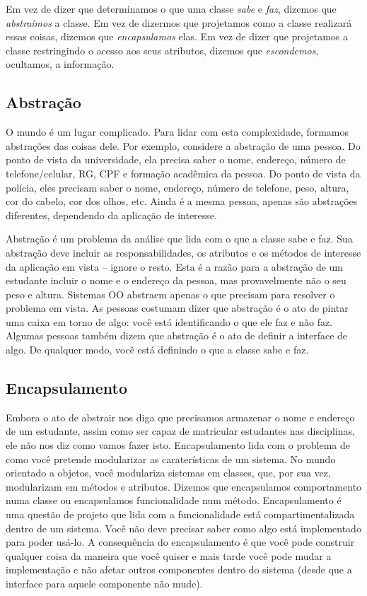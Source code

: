 \documentclass[
	11pt,				%
	openright,
	twoside,			%
	a4paper,			%
	english,			%
	french,
	brazil,				%
	sumario=tradicional
	]{abntex2}
\begin{document}
Em vez de dizer que determinamos o que uma classe \textit{sabe} e \textit{faz}, dizemos que \emph{abstraímos} a classe. Em vez de dizermos que projetamos como a classe realizará essas coisas, dizemos que \emph{encapsulamos} elas. Em vez de dizer que projetamos a classe restringindo o acesso aos seus atributos, dizemos que \emph{escondemos}, ocultamos, a informação.

\subsection{Abstração}

O mundo é um lugar complicado. Para lidar com esta complexidade, formamos abstrações das coisas dele. Por exemplo, considere a abstração de uma pessoa. Do ponto de vista da universidade, ela precisa saber o nome, endereço, número de telefone/celular, RG, CPF e formação acadêmica da pessoa. Do ponto de vista da polícia, eles precisam saber o nome, endereço, número de telefone, peso, altura, cor do cabelo, cor dos olhos, etc. Ainda é a mesma pessoa, apenas são abstrações diferentes, dependendo da aplicação de interesse.

Abstração é um problema da análise que lida com o que a classe sabe e faz. Sua abstração deve incluir as responsabilidades, os atributos e os métodos de interesse da aplicação em vista -- ignore o resto. Esta é a razão para a abstração de um estudante incluir o nome e o endereço da pessoa, mas provavelmente não o seu peso e altura. Sistemas OO abstraem apenas o que precisam para resolver o problema em vista. As pessoas costumam dizer que abstração é o ato de pintar uma caixa em torno de algo: você está identificando o que ele faz e não faz. Algumas pessoas também dizem que abstração é o ato de definir a interface de algo. De qualquer modo, você está definindo o que a classe sabe e faz.

\subsection{Encapsulamento}

Embora o ato de abstrair nos diga que precisamos armazenar o nome e endereço de um estudante, assim como ser capaz de matricular estudantes nas disciplinas, ele não nos diz como vamos fazer isto. Encapsulamento lida com o problema de como você pretende modularizar as caraterísticas de um sistema. No mundo orientado a objetos, você modulariza sistemas em classes, que, por sua vez, modularizam em métodos e atributos. Dizemos que encapsulamos comportamento numa classe ou encapsulamos funcionalidade num método. Encapsulamento é uma questão de projeto que lida com a funcionalidade está compartimentalizada dentro de um sistema. Você não deve precisar saber como algo está implementado para poder usá-lo. A consequência do encapsulamento é que você pode construir qualquer coisa da maneira que você quiser e mais tarde você pode mudar a implementação e não afetar outros componentes dentro do sistema (desde que a interface para aquele componente não mude).
\end{document}
